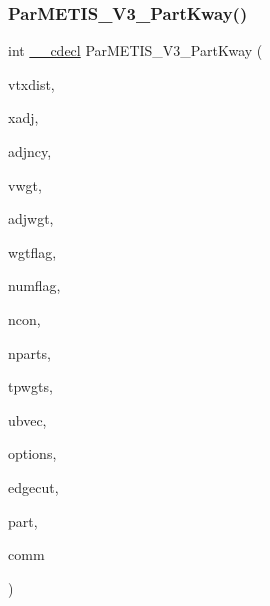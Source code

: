 \subsubsection{\texorpdfstring{Par\+M\+E\+T\+I\+S\+\_\+\+V3\+\_\+\+Part\+Kway()}{ParMETIS\_V3\_PartKway()}}
{\footnotesize\ttfamily int \hyperlink{include_2parmetis_8h_a238347d7669f8f1e9c83bfe63a2730c4}{\+\_\+\+\_\+cdecl} Par\+M\+E\+T\+I\+S\+\_\+\+V3\+\_\+\+Part\+Kway (\begin{DoxyParamCaption}\item[{\hyperlink{3rd_party_2parmetis-4_80_83_2metis_2include_2metis_8h_aaa5262be3e700770163401acb0150f52}{idx\+\_\+t} $\ast$}]{vtxdist,  }\item[{\hyperlink{3rd_party_2parmetis-4_80_83_2metis_2include_2metis_8h_aaa5262be3e700770163401acb0150f52}{idx\+\_\+t} $\ast$}]{xadj,  }\item[{\hyperlink{3rd_party_2parmetis-4_80_83_2metis_2include_2metis_8h_aaa5262be3e700770163401acb0150f52}{idx\+\_\+t} $\ast$}]{adjncy,  }\item[{\hyperlink{3rd_party_2parmetis-4_80_83_2metis_2include_2metis_8h_aaa5262be3e700770163401acb0150f52}{idx\+\_\+t} $\ast$}]{vwgt,  }\item[{\hyperlink{3rd_party_2parmetis-4_80_83_2metis_2include_2metis_8h_aaa5262be3e700770163401acb0150f52}{idx\+\_\+t} $\ast$}]{adjwgt,  }\item[{\hyperlink{3rd_party_2parmetis-4_80_83_2metis_2include_2metis_8h_aaa5262be3e700770163401acb0150f52}{idx\+\_\+t} $\ast$}]{wgtflag,  }\item[{\hyperlink{3rd_party_2parmetis-4_80_83_2metis_2include_2metis_8h_aaa5262be3e700770163401acb0150f52}{idx\+\_\+t} $\ast$}]{numflag,  }\item[{\hyperlink{3rd_party_2parmetis-4_80_83_2metis_2include_2metis_8h_aaa5262be3e700770163401acb0150f52}{idx\+\_\+t} $\ast$}]{ncon,  }\item[{\hyperlink{3rd_party_2parmetis-4_80_83_2metis_2include_2metis_8h_aaa5262be3e700770163401acb0150f52}{idx\+\_\+t} $\ast$}]{nparts,  }\item[{\hyperlink{3rd_party_2parmetis-4_80_83_2metis_2include_2metis_8h_a1924a4f6907cc3833213aba1f07fcbe9}{real\+\_\+t} $\ast$}]{tpwgts,  }\item[{\hyperlink{3rd_party_2parmetis-4_80_83_2metis_2include_2metis_8h_a1924a4f6907cc3833213aba1f07fcbe9}{real\+\_\+t} $\ast$}]{ubvec,  }\item[{\hyperlink{3rd_party_2parmetis-4_80_83_2metis_2include_2metis_8h_aaa5262be3e700770163401acb0150f52}{idx\+\_\+t} $\ast$}]{options,  }\item[{\hyperlink{3rd_party_2parmetis-4_80_83_2metis_2include_2metis_8h_aaa5262be3e700770163401acb0150f52}{idx\+\_\+t} $\ast$}]{edgecut,  }\item[{\hyperlink{3rd_party_2parmetis-4_80_83_2metis_2include_2metis_8h_aaa5262be3e700770163401acb0150f52}{idx\+\_\+t} $\ast$}]{part,  }\item[{M\+P\+I\+\_\+\+Comm $\ast$}]{comm }\end{DoxyParamCaption})}

